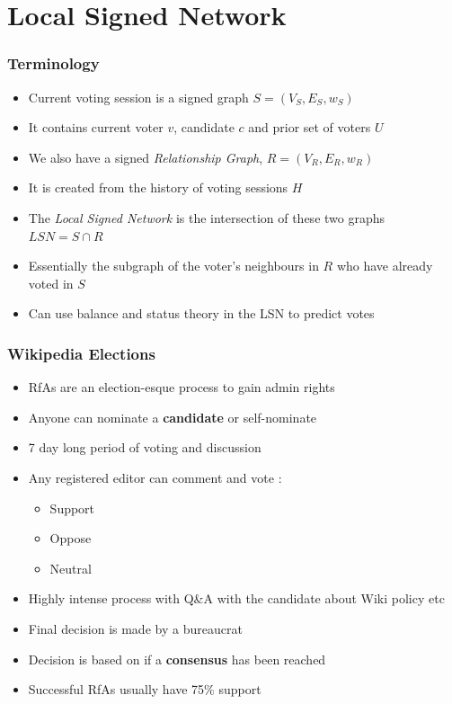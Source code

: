 \documentclass{beamer}
\begin{document}
\section{Local Signed Network}
\begin{frame}
    \frametitle{Terminology}
    \begin{itemize}
        \item Current voting session is a signed graph $S=(V_S,E_S,w_S)$
        \item It contains current voter $v$, candidate $c$ and prior set of voters $U$
        \item We also have a signed \textit{Relationship Graph}, $R = (V_R,E_R,w_R)$
        \item It is created from the history of voting sessions $H$
        \item The \textit{Local Signed Network} is the intersection of these two graphs $LSN = S \cap R$
        \item Essentially the subgraph of the voter's neighbours in $R$ who have already voted in $S$
        \item Can use balance and status theory in the LSN to predict votes
    \end{itemize}
    

\end{frame}

\begin{frame}
    \frametitle{Wikipedia Elections}    
    \begin{itemize}
        \item RfAs are an election-esque process to gain admin rights
        \item Anyone can nominate a \textbf{candidate} or self-nominate
        \item 7 day long period of voting and discussion
        \item Any registered editor can comment and vote :
        \begin{itemize}
            \item Support 
            \item Oppose
            \item Neutral
        \end{itemize}
        \item Highly intense process with Q\&A with the candidate about Wiki policy etc
        \item Final decision is made by a bureaucrat
        \item Decision is based on if a \textbf{consensus} has been reached
        \item Successful RfAs usually have 75\% support
    \end{itemize}

    

\end{frame}
\end{document}
